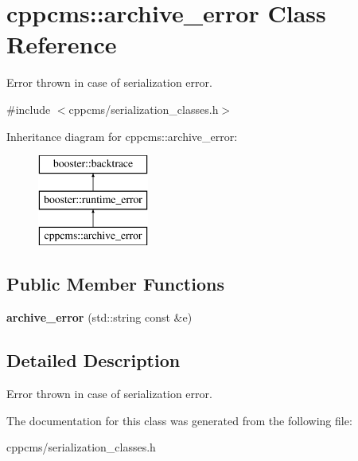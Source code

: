 \section{cppcms\-:\-:archive\-\_\-error \-Class \-Reference}
\label{classcppcms_1_1archive__error}


\-Error thrown in case of serialization error.  




{\ttfamily \#include $<$cppcms/serialization\-\_\-classes.\-h$>$}

\-Inheritance diagram for cppcms\-:\-:archive\-\_\-error\-:\begin{figure}[H]
\begin{center}
\leavevmode
\includegraphics[height=3.000000cm]{classcppcms_1_1archive__error}
\end{center}
\end{figure}
\subsection*{\-Public \-Member \-Functions}
\begin{DoxyCompactItemize}
\item 
{\bfseries archive\-\_\-error} (std\-::string const \&e)\label{classcppcms_1_1archive__error_abe2df913b4c009ffb5fce90f0b81702e}

\end{DoxyCompactItemize}


\subsection{\-Detailed \-Description}
\-Error thrown in case of serialization error. 

\-The documentation for this class was generated from the following file\-:\begin{DoxyCompactItemize}
\item 
cppcms/serialization\-\_\-classes.\-h\end{DoxyCompactItemize}
